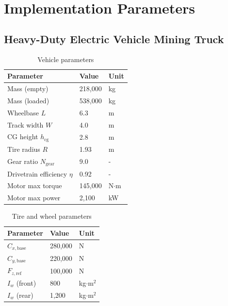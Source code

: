 \documentclass[11pt,a4paper]{article}
\begin{document}
\section{Implementation Parameters}

\subsection{Heavy-Duty Electric Vehicle Mining Truck}

\begin{table}[H]
\centering
\begin{tabular}{lll}
\toprule
\textbf{Parameter} & \textbf{Value} & \textbf{Unit} \\
\midrule
Mass (empty) & 218,000 & kg \\
Mass (loaded) & 538,000 & kg \\
Wheelbase $L$ & 6.3 & m \\
Track width $W$ & 4.0 & m \\
CG height $h_{\text{cg}}$ & 2.8 & m \\
Tire radius $R$ & 1.93 & m \\
Gear ratio $N_{\text{gear}}$ & 9.0 & - \\
Drivetrain efficiency $\eta$ & 0.92 & - \\
Motor max torque & 145,000 & N$\cdot$m \\
Motor max power & 2,100 & kW \\
\bottomrule
\end{tabular}
\caption{Vehicle parameters}
\end{table}

\begin{table}[H]
\centering
\begin{tabular}{lll}
\toprule
\textbf{Parameter} & \textbf{Value} & \textbf{Unit} \\
\midrule
$C_{x,\text{base}}$ & 280,000 & N \\
$C_{y,\text{base}}$ & 220,000 & N \\
$F_{z,\text{ref}}$ & 100,000 & N \\
$I_w$ (front) & 800 & kg$\cdot$m$^2$ \\
$I_w$ (rear) & 1,200 & kg$\cdot$m$^2$ \\
\bottomrule
\end{tabular}
\caption{Tire and wheel parameters}
\end{table}
\end{document}
